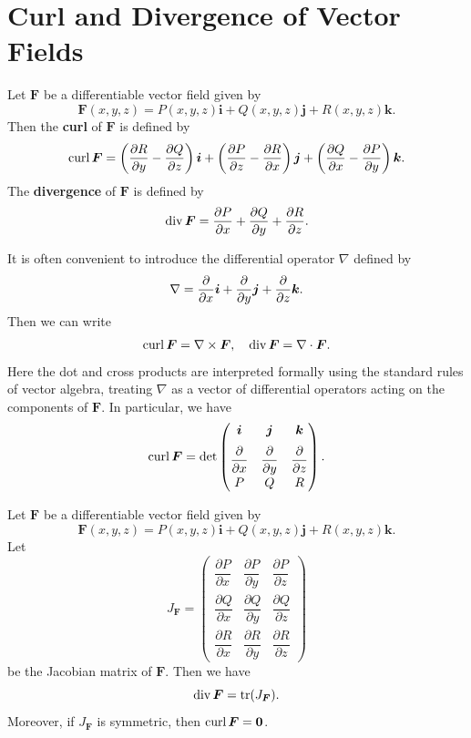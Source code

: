 \section{Curl and Divergence of Vector Fields}
\begin{definitionenv}
    Let $\bm F$ be a differentiable vector field given by
    $$ \bm F(x,y,z) = P(x,y,z)\bm i + Q(x,y,z)\bm j + R(x,y,z)\bm k. $$
    Then the \textbf{curl} of $\bm F$ is defined by
    $$ \operatorname{\mathrm{curl}} \bm F = \left( \pdv{R}{y} - \pdv{Q}{z} \right)\bm i + \left( \pdv{P}{z} - \pdv{R}{x} \right)\bm j + \left( \pdv{Q}{x} - \pdv{P}{y} \right)\bm k. $$
    The \textbf{divergence} of $\bm F$ is defined by
    $$  \operatorname{\mathrm{div}} \bm F = \pdv{P}{x} + \pdv{Q}{y} + \pdv{R}{z}. $$
\end{definitionenv}
\begin{remarkenv}
    It is often convenient to introduce the differential operator $\nabla$ defined by
    $$ \nabla = \pdv{}{x}\bm i + \pdv{}{y}\bm j + \pdv{}{z}\bm k. $$
    Then we can write
    $$ \operatorname{\mathrm{curl}} \bm F = \nabla\times \bm F, \quad  \operatorname{\mathrm{div}} \bm F = \nabla\cdot \bm F. $$
    Here the dot and cross products are interpreted formally using the standard rules of vector algebra, treating $\nabla$ as a vector of differential operators acting on the components of $\bm F$. In particular, we have
    $$
    \operatorname{\mathrm{curl}} \bm F =\det \begin{pmatrix}
        \bm i & \bm j & \bm k\\[6pt]
        \displaystyle \pdv{x} & \displaystyle \pdv{y} & \displaystyle \pdv{z}\\[6pt]
        P & Q & R
    \end{pmatrix}.
    $$
\end{remarkenv}
\begin{propositionenv}
    Let $\bm F$ be a differentiable vector field given by
    $$ \bm F(x,y,z) = P(x,y,z)\bm i + Q(x,y,z)\bm j + R(x,y,z)\bm k. $$
    Let
    $$ J_{\bm F} = \begin{pmatrix}
        \dfrac{\partial P}{\partial x} & \dfrac{\partial P}{\partial y} & \dfrac{\partial P}{\partial z}\\[6pt]
        \dfrac{\partial Q}{\partial x} & \dfrac{\partial Q}{\partial y} & \dfrac{\partial Q}{\partial z}\\[6pt]
        \dfrac{\partial R}{\partial x} & \dfrac{\partial R}{\partial y} & \dfrac{\partial R}{\partial z}
    \end{pmatrix} $$
    be the Jacobian matrix of $\bm F$. Then we have
    $$ \operatorname{\mathrm{div}} \bm F = \tr(J_{\bm F}).$$
    Moreover, if $J_{\bm F}$ is symmetric, then $\operatorname{\mathrm{curl}} \bm F = \bm 0$.
\end{propositionenv}
